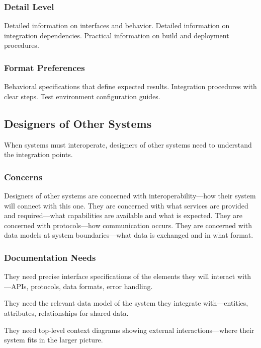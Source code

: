 \documentclass[11pt]{article}
\begin{document}
\subsubsection{Detail Level}

Detailed information on interfaces and behavior. Detailed information on integration dependencies. Practical information on build and deployment procedures.

\subsubsection{Format Preferences}

Behavioral specifications that define expected results. Integration procedures with clear steps. Test environment configuration guides.

\subsection{Designers of Other Systems}

When systems must interoperate, designers of other systems need to understand the integration points.

\subsubsection{Concerns}

Designers of other systems are concerned with interoperability---how their system will connect with this one. They are concerned with what services are provided and required---what capabilities are available and what is expected. They are concerned with protocols---how communication occurs. They are concerned with data models at system boundaries---what data is exchanged and in what format.

\subsubsection{Documentation Needs}

They need precise interface specifications of the elements they will interact with---APIs, protocols, data formats, error handling.

They need the relevant data model of the system they integrate with---entities, attributes, relationships for shared data.

They need top-level context diagrams showing external interactions---where their system fits in the larger picture.
\end{document}
